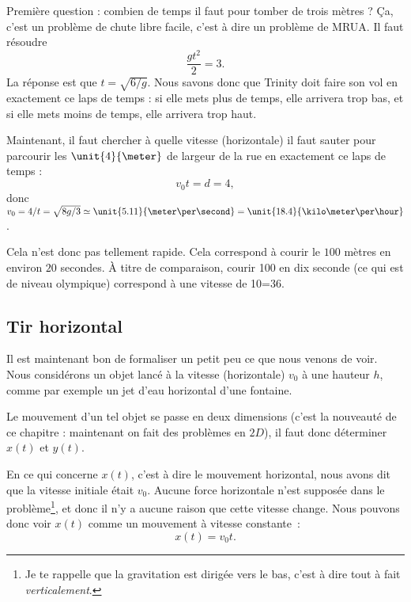 Première question : combien de temps il faut pour tomber de trois mètres ? Ça, c'est un problème de chute libre facile, c'est à dire un problème de MRUA. Il faut résoudre
\begin{equation}
	\frac{ gt^2 }{ 2 }=3.
\end{equation}
La réponse est que $t=\sqrt{6/g}$. Nous savons donc que Trinity doit faire son vol en exactement ce laps de temps : si elle mets plus de temps, elle arrivera trop bas, et si elle mets moins de temps, elle arrivera trop haut.

Maintenant, il faut chercher à quelle vitesse (horizontale) il faut sauter pour parcourir les $\unit{4}{\meter}$ de largeur de la rue en exactement ce laps de temps :
\begin{equation}
	v_0t=d=4,
\end{equation}
donc $v_0=4/t=\sqrt{8g/3}\simeq \unit{5.11}{\meter\per\second}=\unit{18.4}{\kilo\meter\per\hour}$.

Cela n'est donc pas tellement rapide. Cela correspond à courir le $100$ mètres en environ $20$ secondes. À titre de comparaison, courir \unit{100}{\meter} en dix seconde (ce qui est de niveau olympique) correspond à une vitesse de \unit{10}{\meter\per\second}=\unit{36}{\kilo\meter\per\hour}.

\subsection{Tir horizontal}

Il est maintenant bon de formaliser un petit peu ce que nous venons de voir. Nous considérons un objet lancé à la vitesse (horizontale) $v_0$ à une hauteur $h$, comme par exemple un jet d'eau horizontal d'une fontaine.

Le mouvement d'un tel objet se passe en deux dimensions (c'est la nouveauté de ce chapitre : maintenant on fait des problèmes en $2D$), il faut donc déterminer $x(t)$ et $y(t)$.

En ce qui concerne $x(t)$, c'est à dire le mouvement horizontal, nous avons dit que la vitesse initiale était $v_0$. Aucune force horizontale n'est supposée dans le problème\footnote{Je te rappelle que la gravitation est dirigée vers le bas, c'est à dire tout à fait \emph{verticalement}.}, et donc il n'y a aucune raison que cette vitesse change. Nous pouvons donc voir $x(t)$ comme un mouvement à vitesse constante~:
\begin{equation}		\label{Eqxtvt}
	x(t)=v_0t.
\end{equation}

